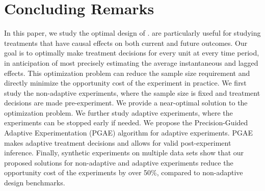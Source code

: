 \section{Concluding Remarks}\label{sec:conclusion}
	In this paper, we study the optimal design of .  are particularly useful for studying  treatments that have causal effects on both current and future outcomes. Our goal is to optimally make treatment decisions for every unit at every time period, in anticipation of most precisely estimating the average instantaneous and lagged effects. This optimization problem can reduce the sample size requirement and directly minimize the opportunity cost of the experiment in practice. We first study the non-adaptive experiments, where the sample size is fixed and treatment decisions are made pre-experiment. We provide a near-optimal solution to the optimization problem.  We further study adaptive experiments, where the experiments can be stopped early if needed. We propose the Precision-Guided Adaptive Experimentation (PGAE) algorithm for adaptive experiments. PGAE makes adaptive treatment decisions and allows for valid post-experiment inference. Finally, synthetic experiments on multiple data sets show that our proposed solutions for non-adaptive and adaptive experiments reduce the opportunity cost of the experiments by over 50\%, compared to non-adaptive design benchmarks.
	
